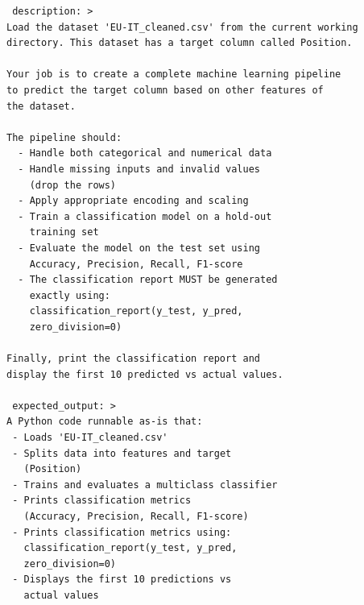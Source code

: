 \begin{tcolorbox}[ left=2pt,   right=2pt,   top=2pt,   bottom=2pt, colback=gray!5,colframe=black!40,title={Initial prompt (No Expertise)}]
\scriptsize
\setlength{\baselineskip}{0.6\baselineskip} \begin{verbatim}
 description: >
Load the dataset 'EU-IT_cleaned.csv' from the current working 
directory. This dataset has a target column called Position.

Your job is to create a complete machine learning pipeline 
to predict the target column based on other features of 
the dataset.

The pipeline should:
  - Handle both categorical and numerical data
  - Handle missing inputs and invalid values 
    (drop the rows)
  - Apply appropriate encoding and scaling
  - Train a classification model on a hold-out 
    training set
  - Evaluate the model on the test set using 
    Accuracy, Precision, Recall, F1-score
  - The classification report MUST be generated 
    exactly using:
    classification_report(y_test, y_pred, 
    zero_division=0)

Finally, print the classification report and 
display the first 10 predicted vs actual values.

 expected_output: >
A Python code runnable as-is that:
 - Loads 'EU-IT_cleaned.csv'
 - Splits data into features and target 
   (Position)
 - Trains and evaluates a multiclass classifier
 - Prints classification metrics 
   (Accuracy, Precision, Recall, F1-score)
 - Prints classification metrics using:
   classification_report(y_test, y_pred, 
   zero_division=0)
 - Displays the first 10 predictions vs 
   actual values
\end{verbatim}
\end{tcolorbox}


